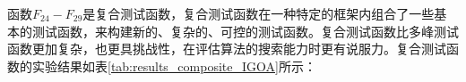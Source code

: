 

函数$F_{24}-F_{29}$是复合测试函数，复合测试函数在一种特定的框架内组合了一些基本的测试函数，来构建新的、复杂的、可控的测试函数。复合测试函数比多峰测试函数更加复杂，也更具挑战性，在评估算法的搜索能力时更有说服力。复合测试函数的实验结果如表\ref{tab:results_composite_IGOA}所示：


